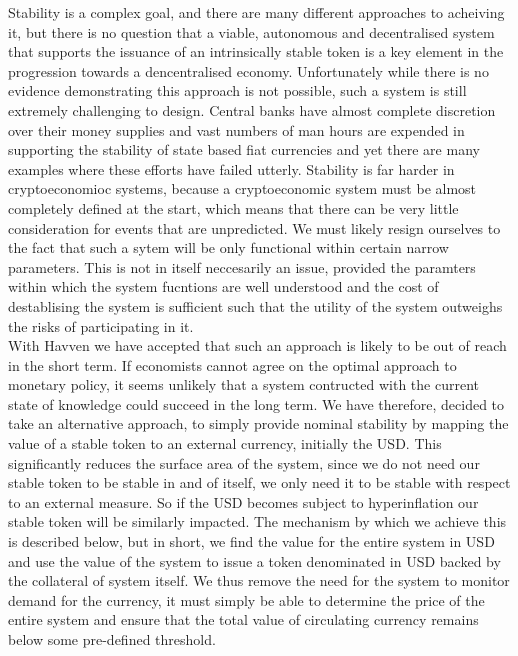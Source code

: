 \noindent Stability is a complex goal, and there are many different approaches to acheiving it, but there is no question that a viable, autonomous and decentralised system that supports the issuance of an intrinsically stable token is a key element in the progression towards a dencentralised economy. Unfortunately while there is no evidence demonstrating this approach is not possible, such a system is still extremely challenging to design. Central banks have almost complete discretion over their money supplies and vast numbers of man hours are expended in supporting the stability of state based fiat currencies and yet there are many examples where these efforts have failed utterly. Stability is far harder in cryptoeconomioc systems, because a cryptoeconomic system must be almost completely defined at the start, which means that there can be very little consideration for events that are unpredicted. We must likely resign ourselves to the fact that such a sytem will be only functional within certain narrow parameters. This is not in itself neccesarily an issue, provided the paramters within which the system fucntions are well understood and the cost of destablising the system is sufficient such that the utility of the system outweighs the risks of participating in it. \\

\noindent With Havven we have accepted that such an approach is likely to be out of reach in the short term. If economists cannot agree on the optimal approach to monetary policy, it seems unlikely that a system contructed with the current state of knowledge could succeed in the long term. We have therefore, decided to take an alternative approach, to simply provide nominal stability by mapping the value of a stable token to an external currency, initially the USD. This significantly reduces the surface area of the system, since we do not need our stable token to be stable in and of itself, we only need it to be stable with respect to an external measure. So if the USD becomes subject to hyperinflation our stable token will be similarly impacted. The mechanism by which we achieve this is described below, but in short, we find the value for the entire system in USD and use the value of the system to issue a token denominated in USD backed by the collateral of system itself. We thus remove the need for the system to monitor demand for the currency, it must simply be able to determine the price of the entire system and ensure that the total value of circulating currency remains below some pre-defined threshold.\\

